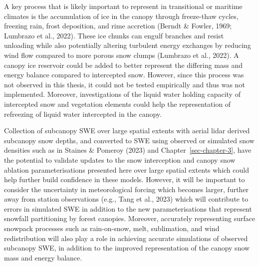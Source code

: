\documentclass[
  letterpaper,
]{tex/uofsthesis-cs}
\begin{document}
A key process that is likely important to represent in transitional or
maritime climates is the accumulation of ice in the canopy through
freeze-thaw cycles, freezing rain, frost deposition, and rime accretion
(Berndt \& Fowler, 1969; Lumbrazo et al., 2022). These ice chunks can
engulf branches and resist unloading while also potentially altering
turbulent energy exchanges by reducing wind flow compared to more porous
snow clumps (Lumbrazo et al., 2022). A canopy ice reservoir could be
added to better represent the differing mass and energy balance compared
to intercepted snow. However, since this process was not observed in
this thesis, it could not be tested empirically and thus was not
implemented. Moreover, investigations of the liquid water holding
capacity of intercepted snow and vegetation elements could help the
representation of refreezing of liquid water intercepted in the canopy.

Collection of subcanopy SWE over large spatial extents with aerial lidar
derived subcanopy snow depths, and converted to SWE using observed or
simulated snow densities such as in Staines \& Pomeroy (2023) and
Chapter~\ref{sec-chapter-3}, have the potential to validate updates to
the snow interception and canopy snow ablation parameterisations
presented here over large spatial extents which could help further build
confidence in these models. However, it will be important to consider
the uncertainty in meteorological forcing which becomes larger, further
away from station observations (e.g., Tang et al., 2023) which will
contribute to errors in simulated SWE in addition to the new
parameterisations that represent snowfall partitioning by forest
canopies. Moreover, accurately representing surface snowpack processes
such as rain-on-snow, melt, sublimation, and wind redistribution will
also play a role in achieving accurate simulations of observed subcanopy
SWE, in addition to the improved representation of the canopy snow mass
and energy balance.
\end{document}
